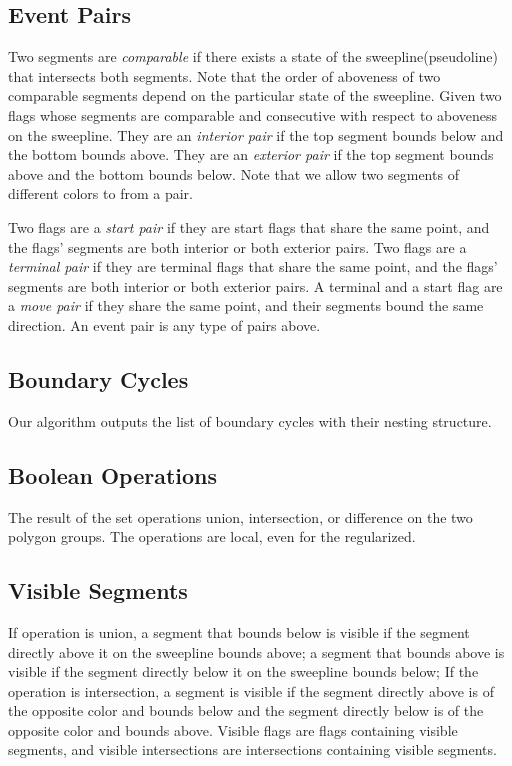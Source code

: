 \documentclass[11pt]{article}
\begin{document}
\subsection{Event Pairs}
Two segments are \textit{comparable} if there exists a state of the sweepline(pseudoline) that intersects both segments.
Note that the order of aboveness of two comparable segments depend on the particular state of the sweepline.
Given two flags whose segments are comparable and consecutive with respect to aboveness on the sweepline.
They are an \textit{interior pair} if the top segment bounds below and the bottom bounds above.
They are an \textit{exterior pair} if the top segment bounds above and the bottom bounds below.
Note that we allow two segments of different colors to from a pair.

Two flags are a \textit{start pair} if they are start flags that share the same point, and the flags' segments are both interior or both exterior pairs.
Two flags are a \textit{terminal pair} if they are terminal flags that share the same point, and the flags' segments are both interior or both exterior pairs.
A terminal and a start flag are a \textit{move pair} if they share the same point, and their segments bound the same direction.
An event pair is any type of pairs above.

\subsection{Boundary Cycles}
Our algorithm outputs the list of boundary cycles with their nesting structure.

\subsection{Boolean Operations}
The result of the set operations union, intersection, or difference on the two polygon groups.
The operations are local, even for the regularized. 

\subsection{Visible Segments}
If operation is union, a segment that bounds below is visible if the segment directly above it on the sweepline bounds above; a segment that bounds above is visible if the segment directly below it on the sweepline bounds below;
If the operation is intersection, a segment is visible if the segment directly above is of the opposite color and bounds below and the segment directly below is of the opposite color and bounds above.
Visible flags are flags containing visible segments, and visible intersections are intersections containing visible segments.
\end{document}
